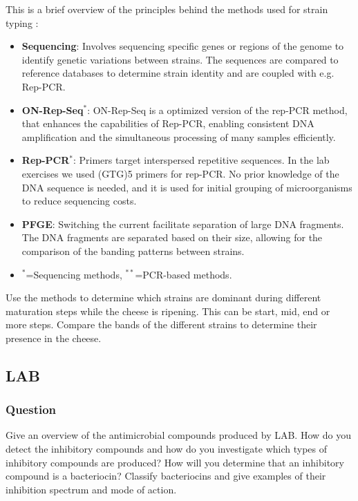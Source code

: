 This is a brief overview of the principles behind the methods used for strain typing \cite*{LS09,L3-SeqBasedClass}:
\begin{itemize}
    \item \textbf{Sequencing}: Involves sequencing specific genes or regions of the genome to identify genetic variations between strains. The sequences are compared to reference databases to determine strain identity and are coupled with e.g. Rep-PCR.
    \item \textbf{ON-Rep-Seq$^*$}: ON-Rep-Seq is a optimized version of the rep-PCR method, that enhances the capabilities of Rep-PCR, enabling consistent DNA amplification and the simultaneous processing of many samples efficiently.
    \item \textbf{Rep-PCR$^*$}: Primers target interspersed repetitive sequences. In the lab exercises we used (GTG)5 primers for rep-PCR. No prior knowledge of the DNA sequence is needed, and it is used for initial grouping of microorganisms to reduce sequencing costs.
    \item \textbf{PFGE}: Switching the current facilitate separation of large DNA fragments. The DNA fragments are separated based on their size, allowing for the comparison of the banding patterns between strains.
    \item $^*$=Sequencing methods, $^{**}$=PCR-based methods.
\end{itemize}

Use the methods to determine which strains are dominant during different maturation steps while the cheese is ripening. This can be start, mid, end or more steps. Compare the bands of the different strains to determine their presence in the cheese.

\subsection{LAB}
\subsubsection*{Question}
Give an overview of the antimicrobial compounds produced by LAB. How do you detect the inhibitory compounds and how do you investigate which types of inhibitory compounds are produced? How will you determine that an inhibitory compound is a bacteriocin? Classify bacteriocins and give examples of their inhibition spectrum and mode of action. 

